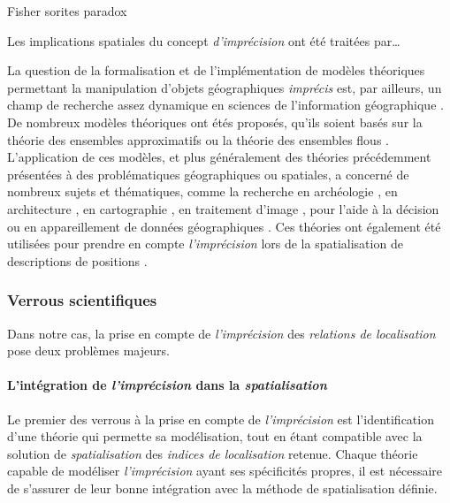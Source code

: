 Fisher sorites paradox

Les implications spatiales du concept \emph{d'imprécision} ont été
traitées par…


La question de la formalisation et de l'implémentation de modèles
théoriques permettant la manipulation d'objets géographiques
\emph{imprécis} est, par ailleurs, un champ de recherche assez
dynamique en sciences de l'information géographique
\autocite{Bunel2020}. De nombreux modèles théoriques ont étés
proposés, qu'ils soient basés sur la théorie des ensembles
approximatifs \autocite{Schneider1996,Cohn1996,Clementini1996} ou la
théorie des ensembles flous \autocite{Schneider1999}. L’application de
ces modèles, et plus généralement des théories précédemment présentées
à des problématiques géographiques ou spatiales, a concerné de
nombreux sujets et thématiques, comme la recherche en archéologie
\autocite{Runz2008a, Zoghlami2016}, en architecture
\autocite{Arabacioglu2010}, en cartographie
\autocite{Didelon2009,Didelon2011}, en traitement d'image
\autocite{Brandtberg2002}, pour l'aide à la décision
\autocite{Griot2007,Makropoulos2003} ou en appareillement de données
géographiques \autocite{Olteanu-Raimond2008}. Ces théories ont
également été utilisées pour prendre en compte \emph{l'imprécision}
lors de la spatialisation de descriptions de positions
\autocite{Takemura2012,Vanegas2011,Bloch1996,Hudelot2008}.

\subsubsection{Verrous scientifiques}

Dans notre cas, la prise en compte de \emph{l'imprécision} des
\emph{relations de localisation} pose deux problèmes majeurs.

\paragraph{L'intégration de \emph{l'imprécision} dans la
  \emph{spatialisation}}

Le premier des verrous à la prise en compte de \emph{l'imprécision}
est l'identification d'une théorie qui permette sa modélisation, tout
en étant compatible avec la solution de \emph{spatialisation} des
\emph{indices de localisation} retenue. Chaque théorie capable de
modéliser \emph{l'imprécision} ayant ses spécificités propres, il est
nécessaire de s'assurer de leur bonne intégration avec la méthode de
spatialisation définie.

